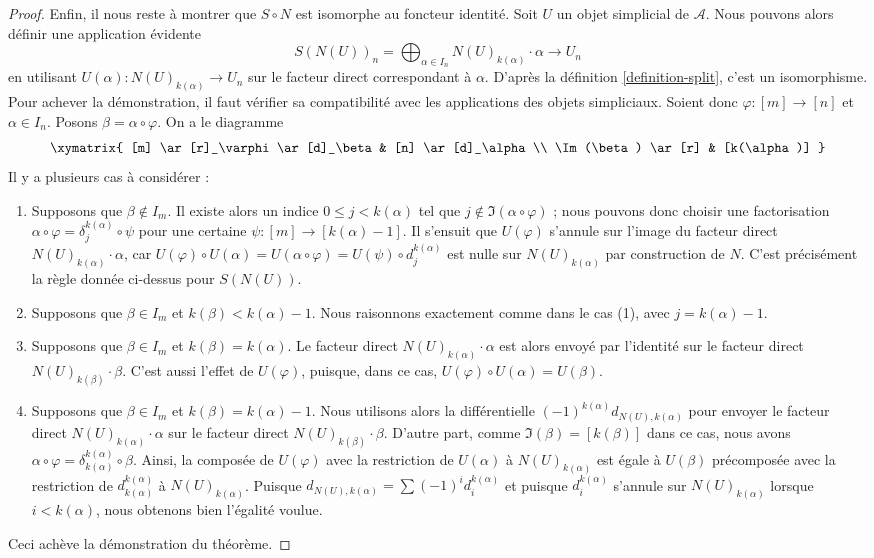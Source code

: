 \begin{proof}
\medskip\noindent
Enfin, il nous reste à montrer que $S \circ N$ est isomorphe au
foncteur identité. Soit $U$ un objet simplicial de $\mathcal{A}$.
Nous pouvons alors définir une application évidente
$$
S(N(U))_n = \bigoplus\nolimits_{\alpha \in I_n} N(U)_{k(\alpha)} \cdot \alpha
\longrightarrow
U_n
$$
en utilisant $U(\alpha) : N(U)_{k(\alpha)} \to U_n$ sur le facteur direct
correspondant à $\alpha$. D'après la définition \ref{definition-split},
c'est un isomorphisme.
Pour achever la démonstration, il faut vérifier sa compatibilité avec
les applications des objets simpliciaux. Soient donc $\varphi : [m] \to [n]$
et $\alpha \in I_n$. Posons $\beta = \alpha \circ \varphi$.
On a le diagramme
$$
\xymatrix{
[m] \ar[r]_\varphi \ar[d]_\beta &
[n] \ar[d]_\alpha \\
\Im(\beta) \ar[r] &
[k(\alpha)]
}
$$
Il y a plusieurs cas à considérer :
\begin{enumerate}
\item Supposons que $\beta \not \in I_m$. Il existe alors un indice
$0 \leq j < k(\alpha)$ tel que $j \not \in \Im(\alpha \circ \varphi)$ ;
nous pouvons donc choisir une factorisation
$\alpha \circ \varphi = \delta^{k(\alpha)}_j \circ \psi$
pour une certaine $\psi : [m] \to [k(\alpha) - 1]$.
Il s'ensuit que $U(\varphi)$ s'annule sur l'image du facteur direct
$N(U)_{k(\alpha)} \cdot \alpha$, car $U(\varphi) \circ U(\alpha) =
U(\alpha \circ \varphi) = U(\psi) \circ d^{k(\alpha)}_j$
est nulle sur $N(U)_{k(\alpha)}$ par construction de $N$.
C'est précisément la règle donnée ci-dessus pour $S(N(U))$.
\item Supposons que $\beta \in I_m$ et $k(\beta) < k(\alpha) - 1$.
Nous raisonnons exactement comme dans le cas (1), avec $j = k(\alpha) - 1$.
\item Supposons que $\beta \in I_m$ et $k(\beta) = k(\alpha)$.
Le facteur direct $N(U)_{k(\alpha)} \cdot \alpha$ est alors envoyé par
l'identité sur le facteur direct $N(U)_{k(\beta)} \cdot \beta$.
C'est aussi l'effet de $U(\varphi)$, puisque, dans ce cas,
$U(\varphi) \circ U(\alpha) = U(\beta)$.
\item Supposons que $\beta \in I_m$ et $k(\beta) = k(\alpha) - 1$.
Nous utilisons alors la différentielle $(-1)^{k(\alpha)} d_{N(U), k(\alpha)}$
pour envoyer le facteur direct $N(U)_{k(\alpha)} \cdot \alpha$
sur le facteur direct $N(U)_{k(\beta)} \cdot \beta$.
D'autre part, comme $\Im(\beta) = [k(\beta)]$ dans ce cas, nous avons
$\alpha \circ \varphi = \delta^{k(\alpha)}_{k(\alpha)} \circ \beta$.
Ainsi, la composée de $U(\varphi)$ avec la restriction de
$U(\alpha)$ à $N(U)_{k(\alpha)}$ est égale à
$U(\beta)$ précomposée avec la restriction de
$d^{k(\alpha)}_{k(\alpha)}$ à $N(U)_{k(\alpha)}$.
Puisque $d_{N(U), k(\alpha)} = \sum (-1)^i d^{k(\alpha)}_i$
et puisque $d^{k(\alpha)}_i$ s'annule sur
$N(U)_{k(\alpha)}$ lorsque $i < k(\alpha)$,
nous obtenons bien l'égalité voulue.
\end{enumerate}
Ceci achève la démonstration du théorème.
\end{proof}
